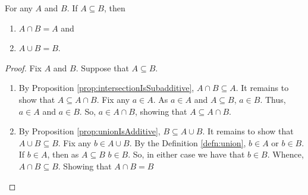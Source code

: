 \guard








\begin{prop}
\label{prop:subsetRelationAndUnionsIntersections}
  For any $A$ and $B$.
  If $A\subseteq B$, then
  \begin{enumerate}
    \item $A\cap B = A$ and
    \item $A\cup B = B$.
  \end{enumerate}
\end{prop}
\begin{proof}
  Fix $A$ and $B$.
  Suppose that $A\subseteq B$.
  \begin{enumerate}
    \item By Proposition \ref{prop:intersectionIsSubadditive}, $A\cap B\subseteq A$.
      It remains to show that $A\subseteq A\cap B$.
      Fix any $a\in A$.
      As $a\in A$ and $A\subseteq B$, $a\in B$.
      Thus, $a\in A$ and $a\in B$.
      So, $a\in A\cap B$, showing that $A\subseteq A\cap B$.

    \item By Proposition \ref{prop:unionIsAdditive}, $B\subseteq A\cup B$.
      It remains to show that $A\cup B\subseteq B$.
      Fix any $b\in A\cup B$.
      By the Definition \ref{defn:union}, $b\in A$ or $b\in B$.
      If $b\in A$, then as $A\subseteq B$ $b\in B$.
      So, in either case we have that $b\in B$.
      Whence, $A\cap B\subseteq B$.
      Showing that $A\cap B= B$
  \end{enumerate}
\end{proof}
